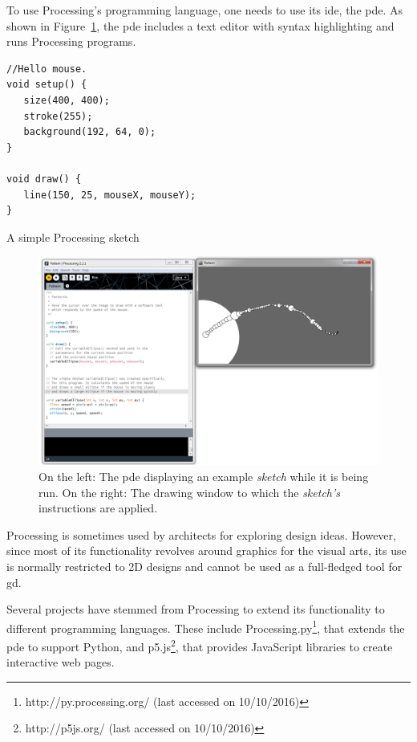 To use Processing's programming language, one needs to use its \gls{ide}, the \acrfull{pde}.
As shown in Figure~\ref{fig:proc:dev:env}, the \gls{pde} includes a text editor with syntax highlighting and runs Processing programs.

\begin{listing}
\begin{verbatim}
//Hello mouse.
void setup() {
   size(400, 400);
   stroke(255);
   background(192, 64, 0);
}

void draw() {
   line(150, 25, mouseX, mouseY);
}
\end{verbatim}
	\caption[A simple Processing sketch]{A simple Processing sketch}
	\label{lst:simple:processing}
\end{listing}

\begin{figure}
	\centering
	\includegraphics[width=1.0\textwidth]{images/proc_dev_env}
	\caption{On the left: The \gls{pde} displaying an example \emph{sketch} while it is being run. On the right: The drawing window to which the \emph{sketch's} instructions are applied.}
	\label{fig:proc:dev:env}
\end{figure}

Processing is sometimes used by architects for exploring design ideas.
However, since most of its functionality revolves around graphics for the visual arts, its use is normally restricted to 2D designs and cannot be used as a full-fledged tool for \gls{gd}.

Several projects have stemmed from Processing to extend its functionality to different programming languages.
These include Processing.py\footnote{http://py.processing.org/ (last accessed on 10/10/2016)}, that extends the \gls{pde} to support Python, and p5.js\footnote{http://p5js.org/ (last accessed on 10/10/2016)}, that provides JavaScript libraries to create interactive web pages.


